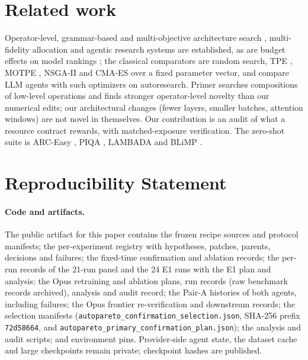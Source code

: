 \documentclass{article}
\newif\ifshowhumanmarkers \showhumanmarkersfalse
\newcommand{\releasepending}{\ifshowhumanmarkers{\color{humanframe}\sffamily\scriptsize\bfseries[RELEASE PENDING]}\ \fi}
\begin{document}
\section{Related work}\label{app:related}
Operator-level, grammar-based and multi-objective architecture search \citep{primer,einspace,mote,monaq}, multi-fidelity allocation \citep{hyperband,bohb} and agentic research systems \citep{autodiscovery,mlestar,airesearcher,mledojo} are established, as are budget effects on model rankings \citep{dehghani2022efficiency,geiping2023cramming,hoffmann2022chinchilla}; the classical comparators are random search, TPE \citep{bergstra2011tpe}, MOTPE \citep{ozaki2020motpe}, NSGA-II \citep{deb2002nsga2} and CMA-ES \citep{hansen2001cmaes} over a fixed parameter vector, and \citet{ferreira} compare LLM agents with such optimizers on autoresearch. Primer searches compositions of low-level operations and finds stronger operator-level novelty than our numerical edits; our architectural changes (fewer layers, smaller batches, attention windows) are not novel in themselves. Our contribution is an audit of what a resource contract rewards, with matched-exposure verification. The zero-shot suite is ARC-Easy \citep{clark2018arc}, PIQA \citep{bisk2020piqa}, LAMBADA \citep{paperno2016lambada} and BLiMP \citep{warstadt2020blimp}.

\section{Reproducibility Statement}\label{app:repro}
\paragraph{Code and artifacts.} \releasepending The public artifact for this paper contains the frozen recipe sources and protocol manifests; the per-experiment registry with hypotheses, patches, parents, decisions and failures; the fixed-time confirmation and ablation records; the per-run records of the 21-run panel and the 24 E1 runs with the E1 plan and analysis; the Opus retraining and ablation plans, run records (raw benchmark records archived), analysis and audit record; the Pair-A histories of both agents, including failures; the Opus frontier re-verification and downstream records; the selection manifests (\texttt{autopareto\_confirmation\_selection.json}, SHA-256 prefix \texttt{72d58664}, and \texttt{autopareto\_primary\_confirmation\_plan.json}); the analysis and audit scripts; and environment pins. Provider-side agent state, the dataset cache and large checkpoints remain private; checkpoint hashes are published.
\end{document}
